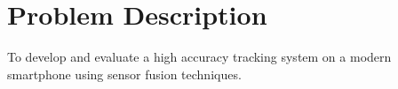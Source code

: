 \chapter{Problem Description}
To develop and evaluate a high accuracy tracking system on a modern smartphone using sensor fusion techniques.

